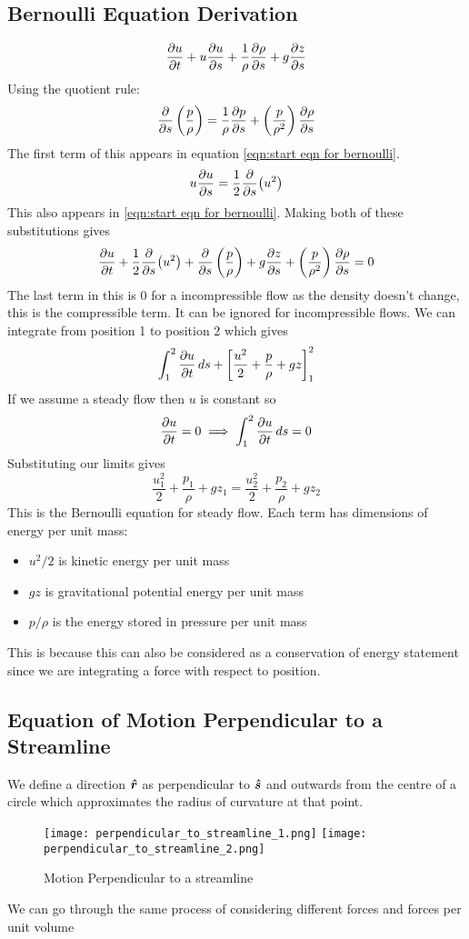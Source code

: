 \documentclass{article}
\begin{document}
    \subsection{Bernoulli Equation Derivation}
    \begin{equation}\label{eqn:start eqn for bernoulli}
        \pdv{u}{t} + u\pdv{u}{s} + \frac{1}{\rho}\pdv{\rho}{s} + g\pdv{z}{s}
    \end{equation}
    Using the quotient rule:
    \[\pdv{s}\left(\frac{p}{\rho}\right) = \frac{1}{\rho}\pdv{p}{s} + \left(\frac{p}{\rho^2}\right)\pdv{\rho}{s}\]
    The first term of this appears in equation \ref{eqn:start eqn for bernoulli}.
    \[u\pdv{u}{s} = \frac{1}{2}\pdv{s}(u^2)\]
    This also appears in \ref{eqn:start eqn for bernoulli}. 
    Making both of these substitutions gives
    \[\pdv{u}{t} + \frac{1}{2}\pdv{s}(u^2) + \pdv{s}\left(\frac{p}{\rho}\right) + g\pdv{z}{s} + \left(\frac{p}{\rho^2}\right)\pdv{\rho}{s} = 0\]
    The last term in this is 0 for a incompressible flow as the density doesn't change, this is the compressible term.
    It can be ignored for incompressible flows.
    We can integrate from position 1 to position 2 which gives
    \[\int_1^2 \pdv{u}{t}\,ds + \left[\frac{u^2}{2} + \frac{p}{\rho} + gz\right]_1^2\]
    If we assume a steady flow then \(u\) is constant so
    \[\pdv{u}{t} = 0\implies \int_1^2\pdv{u}{t}\,ds = 0\]
    Substituting our limits gives
    \begin{equation}\label{eqn:bernoulli}
        \frac{u_1^2}{2} + \frac{p_1}{\rho} + gz_1 = \frac{u_2^2}{2} + \frac{p_2}{\rho} + gz_2
    \end{equation}
    This is the Bernoulli equation for steady flow.
    Each term has dimensions of energy per unit mass:
    \begin{itemize}
        \item \(u^2/2\) is kinetic energy per unit mass
        \item \(gz\) is gravitational potential energy per unit mass
        \item \(p/\rho\) is the energy stored in pressure per unit mass
    \end{itemize}
    This is because this can also be considered as a conservation of energy statement since we are integrating a force with respect to position.
    
    \subsection{Equation of Motion Perpendicular to a Streamline}
    We define a direction \(\bm{\hat{r}}\) as perpendicular to \(\bm{\hat{s}}\) and outwards from the centre of a circle which approximates the radius of curvature at that point.
    \begin{figure}[ht]
        \centering
        \texttt{[image: perpendicular\_to\_streamline\_1.png]}
        \texttt{[image: perpendicular\_to\_streamline\_2.png]}
        \caption{Motion Perpendicular to a streamline}
    \end{figure}
    We can go through the same process of considering different forces and forces per unit volume
\end{document}
